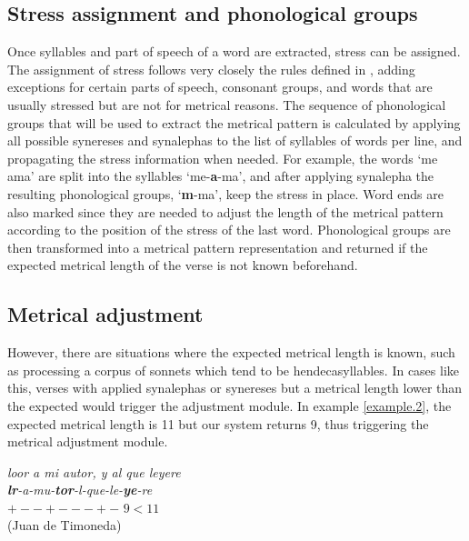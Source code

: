 \documentclass[a4paper,11pt,twocolumn,twoside]{article}
\begin{document}
\subsection{Stress assignment and phonological groups}
Once syllables and part of speech of a word are extracted, stress can be assigned. The assignment of stress follows very closely the rules defined in , adding exceptions for certain parts of speech, consonant groups, and words that are usually stressed but are not for metrical reasons. The sequence of phonological groups that will be used to extract the metrical pattern is calculated by applying all possible synereses and synalephas to the list of syllables of words per line, and propagating the stress information when needed. For example, the words `me ama' are split into the syllables `me-\textbf{a}-ma', and after applying synalepha the resulting phonological groups, `\textbf{m}-ma', keep the stress in place. Word ends are also marked since they are needed to adjust the length of the metrical pattern according to the position of the stress of the last word. Phonological groups are then transformed into a metrical pattern representation and returned if the expected metrical length of the verse is not known beforehand.

\subsection{Metrical adjustment}
However, there are situations where the expected metrical length is known, such as processing a corpus of sonnets which tend to be hendecasyllables. In cases like this, verses with applied synalephas or synereses but a metrical length lower than the expected would trigger the adjustment module.
In example \ref{example.2}, the expected metrical length is 11 but our system returns 9, thus triggering the metrical adjustment module.

\begin{example}\label{example.2}
\textit{loor a mi autor, y al que leyere} \\
\textit{\textbf{lr}-a-mu-\textbf{tor}-l-que-le-\textbf{ye}-re} \\
$+--+---+-$ $9 < 11$ \\
(Juan de Timoneda)
\end{example}
\end{document}
